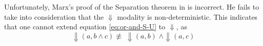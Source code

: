 \documentclass[a4paper,UKenglish,cleveref, autoref, thm-restate, numberwithinsect]{lipics-v2021}
\begin{document}
Unfortunately, Marx's proof of the Separation theorem in \cite{xpathComplete} is incorrect. He fails to take into consideration that the $\Downarrow$ modality is non-deterministic. This indicates that one cannot extend equation \eqref{eq:or-and-S-U} to $\Downarrow$, as
\begin{equation*}
    \Downarrow(a, b \land c) \not\equiv\; \Downarrow(a, b)\; \land \Downarrow(a, c)
\end{equation*}

%








\end{document}
